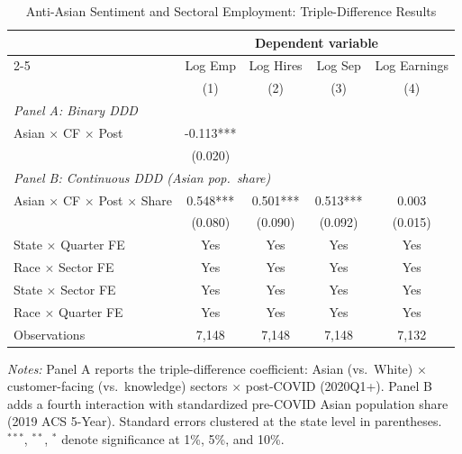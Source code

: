 \begin{table}[t]
\centering
\caption{Anti-Asian Sentiment and Sectoral Employment: Triple-Difference Results}
\label{tab:ddd}
\small
\begin{threeparttable}
\begin{tabular}{lcccc}
\toprule
 & \multicolumn{4}{c}{Dependent variable} \\
\cmidrule(lr){2-5}
 & Log Emp & Log Hires & Log Sep & Log Earnings \\
 & (1) & (2) & (3) & (4) \\
\midrule
\multicolumn{5}{l}{\textit{Panel A: Binary DDD}} \\
Asian $\times$ CF $\times$ Post & -0.113*** & & & \\
 & (0.020) & & & \\
\midrule
\multicolumn{5}{l}{\textit{Panel B: Continuous DDD (Asian pop.\ share)}} \\
Asian $\times$ CF $\times$ Post $\times$ Share & 0.548*** & 0.501*** & 0.513*** & 0.003 \\
 & (0.080) & (0.090) & (0.092) & (0.015) \\
\midrule
State $\times$ Quarter FE & Yes & Yes & Yes & Yes \\
Race $\times$ Sector FE & Yes & Yes & Yes & Yes \\
State $\times$ Sector FE & Yes & Yes & Yes & Yes \\
Race $\times$ Quarter FE & Yes & Yes & Yes & Yes \\
Observations & 7,148 & 7,148 & 7,148 & 7,132 \\
\bottomrule
\end{tabular}
\begin{tablenotes}\small
\item \textit{Notes:} Panel A reports the triple-difference coefficient: Asian (vs.\ White) $\times$ customer-facing (vs.\ knowledge) sectors $\times$ post-COVID (2020Q1+). Panel B adds a fourth interaction with standardized pre-COVID Asian population share (2019 ACS 5-Year). Standard errors clustered at the state level in parentheses. $^{***}$, $^{**}$, $^{*}$ denote significance at 1\%, 5\%, and 10\%.
\end{tablenotes}
\end{threeparttable}
\end{table}
